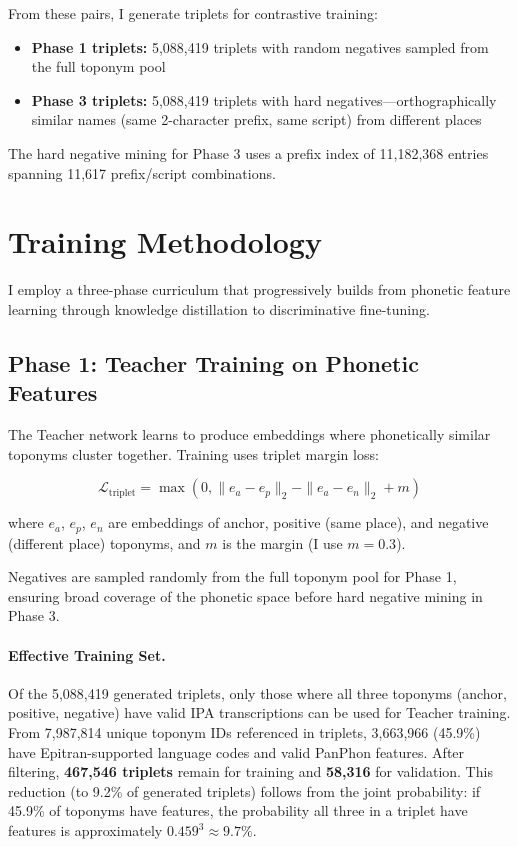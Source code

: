 \documentclass[11pt,a4paper]{article}
\begin{document}
From these pairs, I generate triplets for contrastive training:
\begin{itemize}
    \item \textbf{Phase 1 triplets:} 5,088,419 triplets with random negatives sampled from the full toponym pool
    \item \textbf{Phase 3 triplets:} 5,088,419 triplets with hard negatives---orthographically similar names (same 2-character prefix, same script) from different places
\end{itemize}
The hard negative mining for Phase 3 uses a prefix index of 11,182,368 entries spanning 11,617 prefix/script combinations.

\section{Training Methodology}
\label{sec:training}

I employ a three-phase curriculum that progressively builds from phonetic feature learning through knowledge distillation to discriminative fine-tuning.

\subsection{Phase 1: Teacher Training on Phonetic Features}

The Teacher network learns to produce embeddings where phonetically similar toponyms cluster together. Training uses triplet margin loss:

\begin{equation}
\mathcal{L}_{\text{triplet}} = \max(0, \|e_a - e_p\|_2 - \|e_a - e_n\|_2 + m)
\end{equation}

where $e_a$, $e_p$, $e_n$ are embeddings of anchor, positive (same place), and negative (different place) toponyms, and $m$ is the margin (I use $m = 0.3$).

Negatives are sampled randomly from the full toponym pool for Phase 1, ensuring broad coverage of the phonetic space before hard negative mining in Phase 3.

\paragraph{Effective Training Set.} Of the 5,088,419 generated triplets, only those where all three toponyms (anchor, positive, negative) have valid IPA transcriptions can be used for Teacher training. From 7,987,814 unique toponym IDs referenced in triplets, 3,663,966 (45.9\%) have Epitran-supported language codes and valid PanPhon features. After filtering, \textbf{467,546 triplets} remain for training and \textbf{58,316} for validation. This reduction (to 9.2\% of generated triplets) follows from the joint probability: if 45.9\% of toponyms have features, the probability all three in a triplet have features is approximately $0.459^3 \approx 9.7\%$.
\end{document}
